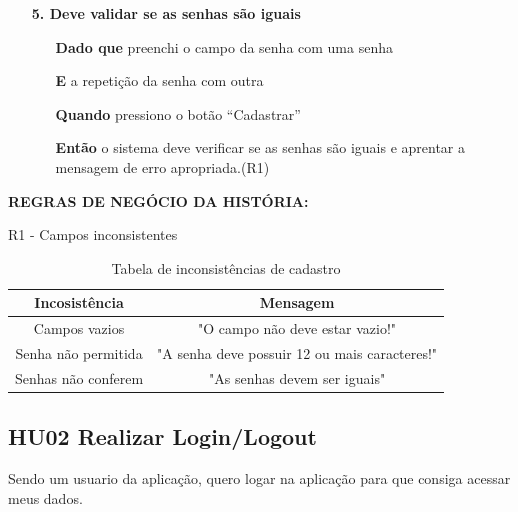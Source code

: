 \begin{itemize}
     \item[] \textbf{5. Deve validar se as senhas são iguais}
    
    \begin{itemize}
        \item[\textbf{Dado que}] preenchi o campo da senha com uma senha
        \item[\textbf{E}] a repetição da senha com outra
        \item[\textbf{Quando}] pressiono o botão ``Cadastrar''
        \item[\textbf{Então}] o sistema deve verificar se as senhas são iguais e aprentar a mensagem de erro apropriada.(R1)
    \end{itemize}

  
\end{itemize}

\textbf{REGRAS DE NEGÓCIO DA HISTÓRIA:}

    R1 - Campos inconsistentes

    \begin{table}[htb]
        \caption{Tabela de inconsistências de cadastro}
        \centering
        \begin{tabular}{|c|c|}
        \hline
          \textbf{Incosistência}   &  \textbf{Mensagem} \\
        \hline
        Campos vazios   & "O campo não deve estar vazio!" \\
        \hline
        Senha não permitida   & "A senha deve possuir 12 ou mais caracteres!" \\
        \hline
        Senhas não conferem   & "As senhas devem ser iguais" \\
        \hline
        \end{tabular}
        \label{tab:tabela_cadastro}
    \end{table}
    
\subsection{HU02 Realizar Login/Logout}

Sendo um usuario da aplicação, quero logar na aplicação para que consiga acessar meus dados.

